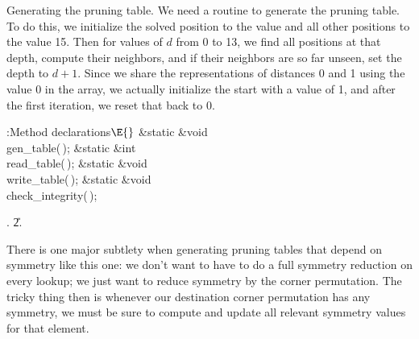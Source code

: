 Generating the pruning table.
We need a routine to generate the pruning table.  To do this, we
initialize the solved position to the value  and all other
positions to the value 15.  Then for values of $d$ from 0 to 13, we
find all positions at that depth, compute their neighbors, and if
their neighbors are so far unseen, set the depth to $d+1$.  Since we
share the representations of distances 0 and 1 using the value 0 in
the array, we actually initialize the start with a value of 1, and
after the first iteration, we reset that back to 0.

\Y\B\4:Method declarations\X${}\E{}$\6
\&{static} \&{void} \\{gen\_table}(\,);\6
\&{static} \&{int} \\{read\_table}(\,);\6
\&{static} \&{void} \\{write\_table}(\,);\6
\&{static} \&{void} \\{check\_integrity}(\,);\par
{}.
\U2.\fi

There is one major subtlety when generating pruning tables that depend
on symmetry like this one: we don't want to have to do a full symmetry
reduction on every lookup; we just want to reduce symmetry by the
corner permutation.  The tricky thing then is whenever our destination
corner permutation has any symmetry, we must be sure to compute and
update all relevant symmetry values for that element.

